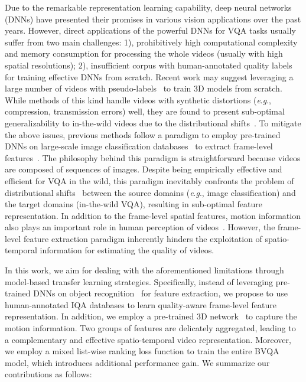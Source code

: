 \documentclass[journal]{IEEEtran}
\newcommand{\eg}{\textit{e}.\textit{g}.}
\begin{document}
Due to the remarkable representation learning capability, deep neural networks (DNNs) have presented their promises in various vision applications over the past years. However, direct applications of the powerful DNNs for VQA tasks usually suffer from two main challenges: 1), prohibitively high computational complexity and memory consumption for processing the whole videos (usually with high spatial resolutions); 2), insufficient corpus with human-annotated quality labels for training effective DNNs from scratch. Recent work may suggest leveraging a large number of videos with pseudo-labels~\cite{zhang2019blind, wu2021no} to train 3D models from scratch. While methods of this kind handle videos with synthetic distortions (\eg, compression, transmission errors) well, they are found to present sub-optimal generalizability to in-the-wild videos due to the distributional shifts~\cite{spatio2021liu}. To mitigate the above issues, previous methods follow a paradigm to employ pre-trained DNNs on large-scale image classification databases~\cite{deng2009imagenet} to extract frame-level features~\cite{li2019quality, li2021unified, tu2021rapique}. The philosophy behind this paradigm is straightforward because videos are composed of sequences of images. Despite being empirically effective and efficient for VQA in the wild, this paradigm inevitably confronts the problem of distributional shifts~\cite{zhou2021domain} between the source domains (\eg, image classification) and the target domains (in-the-wild VQA), resulting in sub-optimal feature representation. In addition to the frame-level spatial features, motion information also plays an important role in human perception of videos~\cite{seshadrinathan2010motion}. However, the frame-level feature extraction paradigm inherently hinders the exploitation of spatio-temporal information for estimating the quality of videos.

In this work, we aim for dealing with the aforementioned limitations through model-based transfer learning strategies. Specifically, instead of leveraging pre-trained DNNs on object recognition~\cite{deng2009imagenet} for feature extraction, we propose to use human-annotated IQA databases to learn quality-aware frame-level feature representation. In addition, we employ a pre-trained 3D network~\cite{feichtenhofer2019slowfast} to capture the motion information. Two groups of features are delicately aggregated, leading to a complementary and effective spatio-temporal video representation. Moreover, we employ a mixed list-wise ranking loss function to train the entire BVQA model, which introduces additional performance gain. We summarize our contributions as follows:
\end{document}
